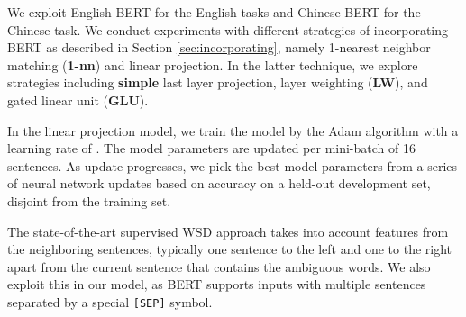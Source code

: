\documentclass[11pt,a4paper]{article}
\begin{document}
We exploit English BERT for the English tasks and Chinese BERT for the Chinese task. We conduct experiments with different strategies of incorporating BERT as described in Section \ref{sec:incorporating}, namely 1-nearest neighbor matching (\textbf{1-nn}) and linear projection. In the latter technique, we explore strategies including \textbf{simple} last layer projection, layer weighting (\textbf{LW}), and gated linear unit (\textbf{GLU}).

In the linear projection model, we train the model by the Adam algorithm \cite{kingma_adam:_2015} with a learning rate of . The model parameters are updated per mini-batch of 16 sentences. As update progresses, we pick the best model parameters from a series of neural network updates based on accuracy on a held-out development set, disjoint from the training set.

The state-of-the-art supervised WSD approach takes into account features from the neighboring sentences, typically one sentence to the left and one to the right apart from the current sentence that contains the ambiguous words. We also exploit this in our model, as BERT supports inputs with multiple sentences separated by a special \texttt{[SEP]} symbol.
\end{document}
